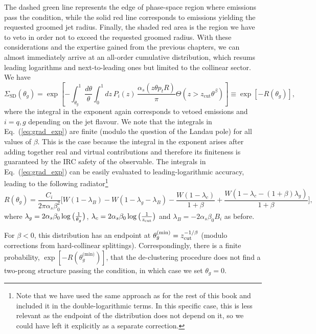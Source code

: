 The dashed green line
    represents the edge of phase-space region where emissions pass the \SD condition, while the solid red line corresponds to
    emissions yielding the requested groomed jet radius. Finally, the
    shaded red area is the region we have to veto in order not to
    exceed the requested groomed radius. With these considerations and
    the expertise gained from the previous chapters, we can almost immediately arrive at an all-order cumulative distribution, which resums leading logarithms and next-to-leading ones but limited to the collinear sector. We have
\begin{equation}\label{eq:grad_exp}
\Sigma_\text{SD}(\theta_g) = \exp\left[
   - \int_{\theta_g}^{1} \frac{d\theta}{\theta}\int_0^{1} dz\, P_{i}(z)\,
   \frac{\alpha_s(z\theta p_tR)}{\pi}
   \Theta\left( z> z_\text{cut}\theta^\beta \right)
\right]\equiv \exp \left[ -R(\theta_g) \right],
\end{equation}
where the integral in the exponent again corresponds to vetoed emissions and $i=q,g$ depending on the jet flavour.
%
We note that the integrals in Eq.~(\ref{eq:grad_exp}) are finite
(modulo the question of the Landau pole) for all values of $\beta$.
%
This is the case because the integral in the exponent arises after adding together real and virtual contributions and therefore its finiteness is guaranteed by the IRC safety of the observable.
%
The integrals in Eq.~(\ref{eq:grad_exp}) can be easily evaluated to
leading-logarithmic accuracy, leading to the following
radiator\footnote{Note that we have used the same approach as for the
  rest of this book and included it in the double-logarithmic
  terms. In this specific case, this is less relevant as the endpoint
  of the distribution does not depend on it, so we could have left it
  explicitly as a separate correction.}
\begin{equation} \label{radiator-rad}
R(\theta_g) 
= \frac{C_i}{2\pi \alpha_s \beta_0^2} \bigg[
     W(1-\lambda_B)
     -W(1-\lambda_g-\lambda_B)
     -\frac{W(1-\lambda_c)}{1+\beta}
     +\frac{W(1-\lambda_c-(1+\beta)\lambda_g)}{1+\beta}\bigg],
   \end{equation}
where $\lambda_g= 2 \alpha_s \beta_0 \log\big(\frac{1}{\theta_g}\big)$,
$\lambda_c= 2 \alpha_s \beta_0 \log\big(\frac{1}{z_\text{cut}}\big)$ and
$\lambda_B=-2\alpha_s\beta_0B_i$ as before.

For $\beta<0$, this distribution has an
endpoint at $\theta_g^\text{(min)}=z_{\text{cut}}^{-1/\beta}$ (modulo corrections from
hard-collinear splittings). Correspondingly, there is a finite probability,
$\exp[-R(\theta_g^\text{(min)})]$, that the \SD de-clustering
procedure does not find a two-prong structure passing the \SD
condition, in which case we set $\theta_g=0$.

